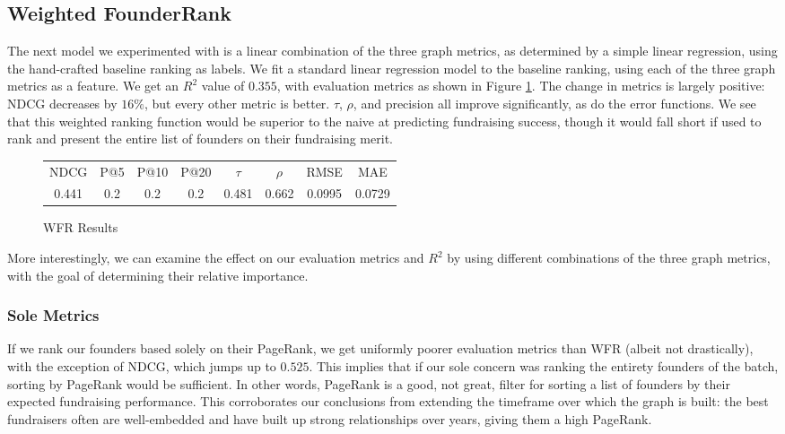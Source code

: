 \subsection{Weighted FounderRank}

The next model we experimented with is a linear combination of the three graph metrics, as determined by a simple linear regression, using the hand-crafted baseline ranking as labels. We fit a standard linear regression model to the baseline ranking, using each of the three graph metrics as a feature. We get an $R^2$ value of $0.355$, with evaluation metrics as shown in Figure \ref{fig:wfr:results}. The change in metrics is largely positive: NDCG decreases by $16\%$, but every other metric is better. $\tau$, $\rho$, and precision all improve significantly, as do the error functions. We see that this weighted ranking function would be superior to the naive at predicting fundraising success, though it would fall short if used to rank and present the entire list of founders on their fundraising merit.

\begin{figure}[ht]
\begin{tabular}{c | c | c | c | c | c | c | c}
NDCG & P@5 & P@10 & P@20 & $\tau$ & $\rho$ & RMSE & MAE  \\
0.441 & 0.2 & 0.2 & 0.2 & 0.481 & 0.662 & 0.0995 & 0.0729 \\
\end{tabular}
\centering
\caption{WFR Results}
\label{fig:wfr:results}
\end{figure}

More interestingly, we can examine the effect on our evaluation metrics and $R^2$ by using different combinations of the three graph metrics, with the goal of determining their relative importance.

\subsubsection{Sole Metrics}

If we rank our founders based solely on their PageRank, we get uniformly poorer evaluation metrics than WFR (albeit not drastically), with the exception of NDCG, which jumps up to $0.525$. This implies that if our sole concern was ranking the entirety founders of the batch, sorting by PageRank would be sufficient. In other words, PageRank is a good, not great, filter for sorting a list of founders by their expected fundraising performance. This corroborates our conclusions from extending the timeframe over which the graph is built: the best fundraisers often are well-embedded and have built up strong relationships over years, giving them a high PageRank.

